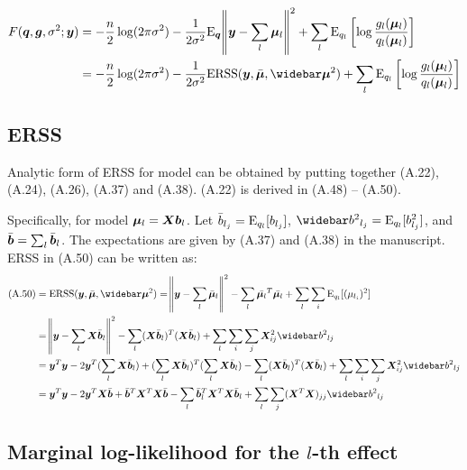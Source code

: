 \begin{align}
    F(\q,\g,\rv; \vy) &= -\frac{n}{2} \log(2\pi\rv) -\frac{1}{2\rv}\E_{\q}\norm{\vy-\sum_l \vmu_l}^2 + \sum_l \E_{q_l}\left[\log\frac{g_l(\vmu_l)}{q_l(\vmu_l)} \right] \label{eqn:Fexplicit}\\
    &= -\frac{n}{2} \log(2\pi\rv) - \frac{1}{2\rv} \ERSS(\vy,\emu,\emusq) + \sum_l \E_{q_l}\left[ \log\frac{g_l(\vmu_l)}{q_l(\vmu_l)} \right]  
\end{align}

\subsection{ERSS}

Analytic form of ERSS for \susie model can be obtained by putting together (A.22), (A.24), (A.26), (A.37) and (A.38). (A.22) is derived in (A.48) -- (A.50).

Specifically, for \susie model $\bm \mu_l = \bm X \bm b_l$. Let $\bar{b}_{l_j} = \text{E}_{q_l}[b_{l_j}]$, $\bbb_{l_j} = \E_{q_l}[b^2_{l_j}]$, and $\bar{\bm{b}} = \sum_l \bar{\bm{b}}_{l}$. The expectations are given by (A.37) and (A.38) in the manuscript. ERSS in (A.50) can be written as:
\begin{align}
    \text{(A.50)} &= \ERSS(\vy,\emu,\emusq) = \norm{\vy-\sum_l \emul}^2 - \sum_l \bar{\vmu_l}^T \bar{\vmu_l} + \sum_l \sum_i \E_{q_l}[(\mu_{l_i})^2] \\
    &= \norm{\vy-\sum_l \mx \vbb_l}^2 - \sum_l (\mx \vbb_l)^T (\mx \vbb_l) + \sum_l \sum_i \sum_{j} \mx_{ij}^{2}  \bbb_{lj} \\
    &= \vy^T\vy - 2 \vy^T (\sum_l \mx \vbb_l) + (\sum_l \mx \vbb_l)^T(\sum_l \mx \vbb_l) - \sum_l (\mx \vbb_l)^T (\mx \vbb_l) + \sum_l \sum_i \sum_{j} \mx_{ij}^{2}  \bbb_{lj} \\
    &= \vy^T\vy - 2 \vy^T\mx \bar{\vb} + \bar{\vb}^T \mx^T\mx \bar{\vb} - \sum_l \bar{\vb}_l^T \mx^T \mx \bar{\vb}_l + \sum_l \sum_j (\mx^T \mx)_{jj} \bbb_{lj} \label{eqn:erss}
\end{align}

\subsection{Marginal log-likelihood for the $l$-th effect}

